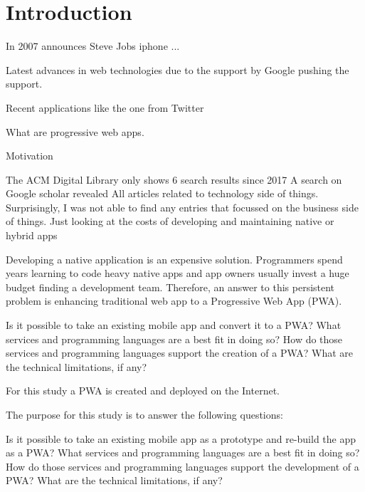 \chapter{Introduction}


In 2007 announces Steve Jobs iphone ...

Latest advances in web technologies due to the support by Google pushing the support.

Recent applications like the one from Twitter

What are progressive web apps.

Motivation
\cite{liebelProgressiveWebApps2019}

The ACM Digital Library only shows 6 search results since 2017
A search on Google scholar revealed All articles related to technology side of things. Surprisingly, I was not able to find any entries that focussed on the business side of things. Just looking at the costs of developing and maintaining native or hybrid apps

Developing a native application is an expensive solution. Programmers spend years learning to code heavy native apps and app owners usually invest a huge budget finding a development team. Therefore, an answer to this persistent problem is enhancing traditional web app to a Progressive Web App (PWA). \citep{nguyen2019progressive}

Is it possible to take an existing mobile app and convert it to a PWA?
What services and programming languages are a best fit in doing so?
How do those services and programming languages support the creation of a PWA?
What are the technical limitations, if any?



For this study a PWA is created and deployed on the Internet.

The purpose for this study is to answer the following questions:

Is it possible to take an existing mobile app as a prototype and re-build the app as a PWA?
What services and programming languages are a best fit in doing so?
How do those services and programming languages support the development of a PWA?
What are the technical limitations, if any?
